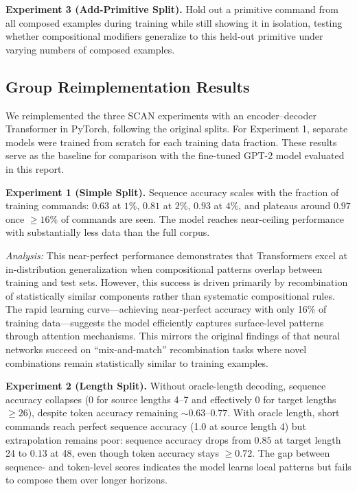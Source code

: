 \documentclass[11pt]{article}
\begin{document}
\textbf{Experiment 3 (Add-Primitive Split).} Hold out a primitive command from all composed examples during training while still showing it in isolation, testing whether compositional modifiers generalize to this held-out primitive under varying numbers of composed examples.

\subsection{Group Reimplementation Results}

We reimplemented the three SCAN experiments with an encoder--decoder Transformer in PyTorch, following the original splits. For Experiment 1, separate models were trained from scratch for each training data fraction. These results serve as the baseline for comparison with the fine-tuned GPT-2 model evaluated in this report.

\textbf{Experiment 1 (Simple Split).} Sequence accuracy scales with the fraction of training commands: $0.63$ at $1\%$, $0.81$ at $2\%$, $0.93$ at $4\%$, and plateaus around $0.97$ once $\geq16\%$ of commands are seen. The model reaches near-ceiling performance with substantially less data than the full corpus.

\textit{Analysis:} This near-perfect performance demonstrates that Transformers excel at in-distribution generalization when compositional patterns overlap between training and test sets. However, this success is driven primarily by recombination of statistically similar components rather than systematic compositional rules. The rapid learning curve---achieving near-perfect accuracy with only 16\% of training data---suggests the model efficiently captures surface-level patterns through attention mechanisms. This mirrors the original findings of \citet{lake2018generalizationsystematicitycompositionalskills} that neural networks succeed on ``mix-and-match'' recombination tasks where novel combinations remain statistically similar to training examples.

\textbf{Experiment 2 (Length Split).} Without oracle-length decoding, sequence accuracy collapses (0 for source lengths 4--7 and effectively 0 for target lengths $\geq26$), despite token accuracy remaining $\sim0.63$--$0.77$. With oracle length, short commands reach perfect sequence accuracy (1.0 at source length 4) but extrapolation remains poor: sequence accuracy drops from $0.85$ at target length 24 to $0.13$ at 48, even though token accuracy stays $\geq0.72$. The gap between sequence- and token-level scores indicates the model learns local patterns but fails to compose them over longer horizons.
\end{document}
